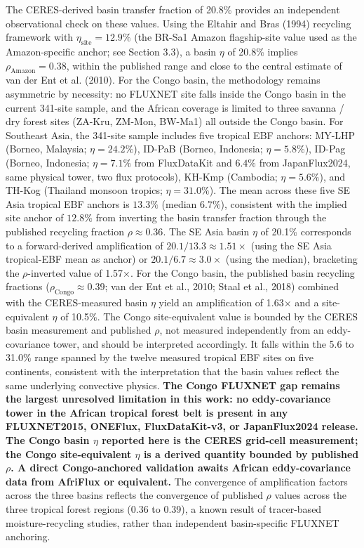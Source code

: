 The CERES-derived basin transfer fraction of 20.8\% provides an independent observational check on these values. Using the Eltahir and Bras (1994) recycling framework with \(\eta_{\text{site}} = 12.9\%\) (the BR-Sa1 Amazon flagship-site value used as the Amazon-specific anchor; see Section 3.3), a basin \(\eta\) of 20.8\% implies \(\rho_{\text{Amazon}} = 0.38\), within the published range and close to the central estimate of van der Ent et al. (2010). For the Congo basin, the methodology remains asymmetric by necessity: no FLUXNET site falls inside the Congo basin in the current 341-site sample, and the African coverage is limited to three savanna / dry forest sites (ZA-Kru, ZM-Mon, BW-Ma1) all outside the Congo basin. For Southeast Asia, the 341-site sample includes five tropical EBF anchors: MY-LHP (Borneo, Malaysia; $\eta = 24.2\%$), ID-PaB (Borneo, Indonesia; $\eta = 5.8\%$), ID-Pag (Borneo, Indonesia; $\eta = 7.1\%$ from FluxDataKit and $6.4\%$ from JapanFlux2024, same physical tower, two flux protocols), KH-Kmp (Cambodia; $\eta = 5.6\%$), and TH-Kog (Thailand monsoon tropics; $\eta = 31.0\%$). The mean across these five SE Asia tropical EBF anchors is $13.3\%$ (median $6.7\%$), consistent with the implied site anchor of $12.8\%$ from inverting the basin transfer fraction through the published recycling fraction $\rho \approx 0.36$. The SE Asia basin $\eta$ of 20.1\% corresponds to a forward-derived amplification of $20.1/13.3 \approx 1.51\times$ (using the SE Asia tropical-EBF mean as anchor) or $20.1/6.7 \approx 3.0\times$ (using the median), bracketing the $\rho$-inverted value of 1.57×. For the Congo basin, the published basin recycling fractions ($\rho_{\text{Congo}} \approx 0.39$; van der Ent et al., 2010; Staal et al., 2018) combined with the CERES-measured basin $\eta$ yield an amplification of 1.63× and a site-equivalent $\eta$ of 10.5\%. The Congo site-equivalent value is bounded by the CERES basin measurement and published $\rho$, not measured independently from an eddy-covariance tower, and should be interpreted accordingly. It falls within the 5.6 to 31.0\% range spanned by the twelve measured tropical EBF sites on five continents, consistent with the interpretation that the basin values reflect the same underlying convective physics. \textbf{The Congo FLUXNET gap remains the largest unresolved limitation in this work: no eddy-covariance tower in the African tropical forest belt is present in any FLUXNET2015, ONEFlux, FluxDataKit-v3, or JapanFlux2024 release. The Congo basin $\eta$ reported here is the CERES grid-cell measurement; the Congo site-equivalent $\eta$ is a derived quantity bounded by published $\rho$. A direct Congo-anchored validation awaits African eddy-covariance data from AfriFlux or equivalent.} The convergence of amplification factors across the three basins reflects the convergence of published \(\rho\) values across the three tropical forest regions (0.36 to 0.39), a known result of tracer-based moisture-recycling studies, rather than independent basin-specific FLUXNET anchoring.

